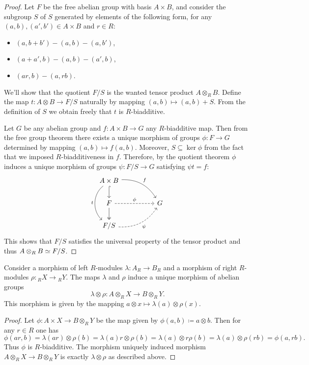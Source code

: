 \begin{proof}
Let \(F\) be the free abelian group with basis \(A \times B\), and consider the
subgroup \(S\) of \(S\) generated by elements of the following form, for any
\((a, b), (a', b') \in A \times B\) and \(r \in R\):
\begin{itemize}\setlength\itemsep{0em}
\item \((a, b + b') - (a, b) - (a, b')\),
\item \((a + a', b) - (a, b) - (a', b)\),
\item \((a r, b) - (a, r b)\).
\end{itemize}
We'll show that the quotient \(F/S\) is the wanted tensor product
\(A \otimes_R B\). Define the map \(t: A \otimes B \to F/S\)
naturally by mapping \((a, b) \mapsto (a, b) + S\). From the definition of
\(S\) we obtain freely that \(t\) is \(R\)-biadditive.

Let \(G\) be any abelian group and \(f: A \times B \to G\) any \(R\)-biadditive
map. Then from the free group theorem there exists a unique morphism of groups
\(\phi: F \to G\) determined by mapping \((a, b) \mapsto f(a, b)\). Moreover,
\(S \subseteq \ker \phi\) from the fact that we imposed \(R\)-biadditiveness in
\(f\). Therefore, by the quotient theorem \(\phi\) induces a unique morphism of
groups \(\psi: F/S \to G\) satisfying \(\psi t = f\):
\[
\begin{tikzcd}
A \times B \ar[rrd, bend left, "f"]
\ar[d, hook]
\ar[dd, bend right=50, "t"']
&&\\
F \ar[rr, dashed, "\phi"]
\ar[d, two heads]
&&G \\
F/S \ar[rru, bend right, "\psi"', dashed]
&&
\end{tikzcd}
\]
This shows that \(F/S\) satisfies the universal property of the tensor product
and thus \(A \otimes_R B \simeq F/S\).
\end{proof}

\begin{proposition}
\label{prop:tensoring-maps}
Consider a morphism of left \(R\)-modules \(\lambda: A_R \to B_R\) and a
morphism of right \(R\)-modules \(\rho: {}_RX \to {}_RY\). The maps \(\lambda\)
and \(\rho\) induce a unique morphism of abelian groups
\[
\lambda \otimes \rho: A \otimes_R X \longrightarrow B \otimes_R Y.
\]
This morphism is given by the mapping
\(a \otimes x \mapsto \lambda(a) \otimes \rho(x)\).
\end{proposition}

\begin{proof}
Let \(\phi: A \times X \to B \otimes_R Y\) be the map given by
\(\phi(a, b) \coloneq a \otimes b\). Then for any \(r \in R\) one has
\[
\phi(a r, b)
= \lambda(a r) \otimes \rho(b)
= \lambda(a) r \otimes \rho(b)
= \lambda(a) \otimes r \rho(b)
= \lambda(a) \otimes \rho(r b)
= \phi(a, r b).
\]
Thus \(\phi\) is \(R\)-biadditive. The morphism uniquely induced morphism
\(A \otimes_R X \to B \otimes_R Y\) is exactly \(\lambda \otimes \rho\) as
described above.
\end{proof}

